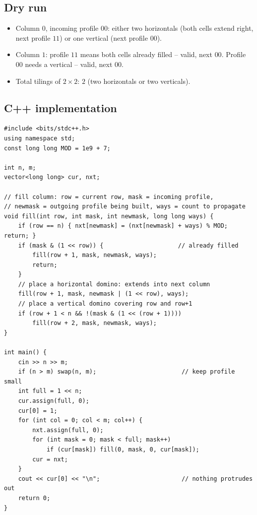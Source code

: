 \subsection*{Dry run}


\begin{itemize}
  \item Column $0$, incoming profile $00$: either two horizontals (both
        cells extend right, next profile $11$) or one vertical (next
        profile $00$).
  \item Column $1$: profile $11$ means both cells already filled -- valid,
        next $00$. Profile $00$ needs a vertical -- valid, next $00$.
  \item Total tilings of $2\times2$: $2$ (two horizontals or two
        verticals).
\end{itemize}

\subsection*{C++ implementation}

\begin{lstlisting}
#include <bits/stdc++.h>
using namespace std;
const long long MOD = 1e9 + 7;

int n, m;
vector<long long> cur, nxt;

// fill column: row = current row, mask = incoming profile,
// newmask = outgoing profile being built, ways = count to propagate
void fill(int row, int mask, int newmask, long long ways) {
    if (row == n) { nxt[newmask] = (nxt[newmask] + ways) % MOD; return; }
    if (mask & (1 << row)) {                     // already filled
        fill(row + 1, mask, newmask, ways);
        return;
    }
    // place a horizontal domino: extends into next column
    fill(row + 1, mask, newmask | (1 << row), ways);
    // place a vertical domino covering row and row+1
    if (row + 1 < n && !(mask & (1 << (row + 1))))
        fill(row + 2, mask, newmask, ways);
}

int main() {
    cin >> n >> m;
    if (n > m) swap(n, m);                        // keep profile small
    int full = 1 << n;
    cur.assign(full, 0);
    cur[0] = 1;
    for (int col = 0; col < m; col++) {
        nxt.assign(full, 0);
        for (int mask = 0; mask < full; mask++)
            if (cur[mask]) fill(0, mask, 0, cur[mask]);
        cur = nxt;
    }
    cout << cur[0] << "\n";                       // nothing protrudes out
    return 0;
}
\end{lstlisting}

